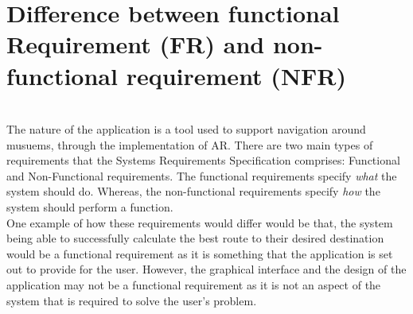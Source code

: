 

\section{Difference between functional Requirement (FR) and non-functional requirement (NFR)} \\

The nature of the application is a tool used to support navigation around musuems, through the implementation of AR. There are two main types of requirements that the Systems Requirements Specification comprises: Functional and Non-Functional requirements. The functional requirements specify \textit{what} the system should do. Whereas, the non-functional requirements specify \textit{how} the system should perform a function.\\

One example of how these requirements would differ would be that, the system being able to successfully calculate the best route to their desired destination would be a functional requirement as it is something that the application is set out to provide for the user. However, the graphical interface and the design of the application may not be a functional requirement as it is not an aspect of the system that is required to solve the user's problem.



